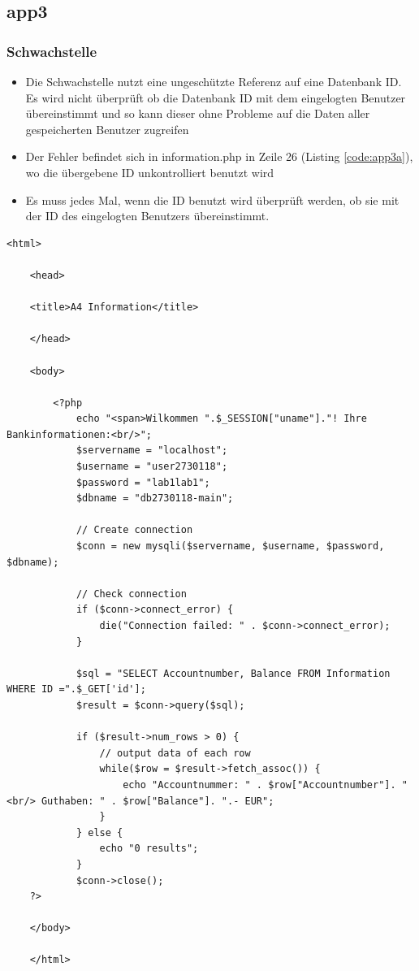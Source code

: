\documentclass[12pt,a4paper,titlepage,oneside]{scrartcl}
\begin{document}

\subsection{app3}

\subsubsection{Schwachstelle}
\begin{itemize}
	\item Die Schwachstelle nutzt eine ungeschützte Referenz auf eine Datenbank ID. Es wird nicht überprüft ob die Datenbank ID mit dem eingelogten Benutzer übereinstimmt und so kann dieser ohne Probleme auf die Daten aller gespeicherten Benutzer zugreifen
	
	\item Der Fehler befindet sich in information.php in Zeile 26 (Listing \ref*{code:app3a}), wo die übergebene ID unkontrolliert benutzt wird
	
	\item Es muss jedes Mal, wenn die ID benutzt wird überprüft werden, ob sie mit der ID des eingelogten Benutzers übereinstimmt.
\end{itemize}

\begin{lstlisting}[caption=App3 verwundbar,label=code:app3a,style=c]
	<html>
	
	<head>
	
	<title>A4 Information</title>
	
	</head>
	
	<body>
	
		<?php
			echo "<span>Wilkommen ".$_SESSION["uname"]."! Ihre Bankinformationen:<br/>";
			$servername = "localhost";
			$username = "user2730118";
			$password = "lab1lab1";
			$dbname = "db2730118-main";
			
			// Create connection
			$conn = new mysqli($servername, $username, $password, $dbname);
			
			// Check connection
			if ($conn->connect_error) {
				die("Connection failed: " . $conn->connect_error);
			}
			
			$sql = "SELECT Accountnumber, Balance FROM Information WHERE ID =".$_GET['id'];
			$result = $conn->query($sql);
			
			if ($result->num_rows > 0) {
				// output data of each row
				while($row = $result->fetch_assoc()) {
					echo "Accountnummer: " . $row["Accountnumber"]. "<br/> Guthaben: " . $row["Balance"]. ".- EUR";
				}
			} else {
				echo "0 results";
			}
			$conn->close();
	?>
		
	</body>
	
	</html>
	
\end{lstlisting}
\end{document}
